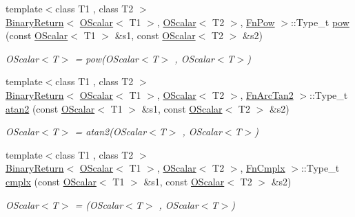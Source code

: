 \begin{DoxyCompactItemize}
\item 
{\footnotesize template$<$class T1 , class T2 $>$ }\\\mbox{\hyperlink{structENSEM_1_1BinaryReturn}{Binary\+Return}}$<$ \mbox{\hyperlink{classENSEM_1_1OScalar}{O\+Scalar}}$<$ T1 $>$, \mbox{\hyperlink{classENSEM_1_1OScalar}{O\+Scalar}}$<$ T2 $>$, \mbox{\hyperlink{structENSEM_1_1FnPow}{Fn\+Pow}} $>$\+::Type\+\_\+t \mbox{\hyperlink{group__obsscalar_ga9cb05cc2982ed462255669689f38c8cd}{pow}} (const \mbox{\hyperlink{classENSEM_1_1OScalar}{O\+Scalar}}$<$ T1 $>$ \&s1, const \mbox{\hyperlink{classENSEM_1_1OScalar}{O\+Scalar}}$<$ T2 $>$ \&s2)
\begin{DoxyCompactList}\small\item\em O\+Scalar$<$\+T$>$ = pow(\+O\+Scalar$<$\+T$>$ , O\+Scalar$<$\+T$>$) \end{DoxyCompactList}\item 
{\footnotesize template$<$class T1 , class T2 $>$ }\\\mbox{\hyperlink{structENSEM_1_1BinaryReturn}{Binary\+Return}}$<$ \mbox{\hyperlink{classENSEM_1_1OScalar}{O\+Scalar}}$<$ T1 $>$, \mbox{\hyperlink{classENSEM_1_1OScalar}{O\+Scalar}}$<$ T2 $>$, \mbox{\hyperlink{structENSEM_1_1FnArcTan2}{Fn\+Arc\+Tan2}} $>$\+::Type\+\_\+t \mbox{\hyperlink{group__obsscalar_gaa28e2966b2f7ca96382766631b1e7bd1}{atan2}} (const \mbox{\hyperlink{classENSEM_1_1OScalar}{O\+Scalar}}$<$ T1 $>$ \&s1, const \mbox{\hyperlink{classENSEM_1_1OScalar}{O\+Scalar}}$<$ T2 $>$ \&s2)
\begin{DoxyCompactList}\small\item\em O\+Scalar$<$\+T$>$ = atan2(\+O\+Scalar$<$\+T$>$ , O\+Scalar$<$\+T$>$) \end{DoxyCompactList}\item 
{\footnotesize template$<$class T1 , class T2 $>$ }\\\mbox{\hyperlink{structENSEM_1_1BinaryReturn}{Binary\+Return}}$<$ \mbox{\hyperlink{classENSEM_1_1OScalar}{O\+Scalar}}$<$ T1 $>$, \mbox{\hyperlink{classENSEM_1_1OScalar}{O\+Scalar}}$<$ T2 $>$, \mbox{\hyperlink{structENSEM_1_1FnCmplx}{Fn\+Cmplx}} $>$\+::Type\+\_\+t \mbox{\hyperlink{group__obsscalar_gabf1bc6f0ef1fc4fa374ff48fddcbe9b3}{cmplx}} (const \mbox{\hyperlink{classENSEM_1_1OScalar}{O\+Scalar}}$<$ T1 $>$ \&s1, const \mbox{\hyperlink{classENSEM_1_1OScalar}{O\+Scalar}}$<$ T2 $>$ \&s2)
\begin{DoxyCompactList}\small\item\em O\+Scalar$<$\+T$>$ = (O\+Scalar$<$\+T$>$ , O\+Scalar$<$\+T$>$) \end{DoxyCompactList}\item 

\end{DoxyCompactItemize}
